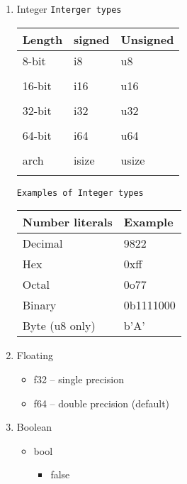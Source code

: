 \documentclass[11pt]{article}
\begin{document}
\begin{enumerate}
\item Integer
\texttt{Interger types}

\begin{center}
\begin{tabular}{lll}
Length & signed & Unsigned\\
\hline
8-bit & i8 & u8\\
 &  & \\
16-bit & i16 & u16\\
 &  & \\
32-bit & i32 & u32\\
 &  & \\
64-bit & i64 & u64\\
 &  & \\
arch & isize & usize\\
 &  & \\
\end{tabular}
\end{center}

\texttt{Examples of Integer types}

\begin{center}
\begin{tabular}{ll}
Number literals & Example\\
\hline
Decimal & 9822\\
Hex & 0xff\\
Octal & 0o77\\
Binary & 0b1111000\\
Byte (u8 only) & b'A'\\
\end{tabular}
\end{center}

\item Floating

\begin{itemize}
\item f32 -- single precision

\item f64 -- double precision (default)
\end{itemize}

\item Boolean

\begin{itemize}
\item bool

\begin{itemize}
\item false


\end{itemize}
\end{itemize}
\end{enumerate}
\end{document}
